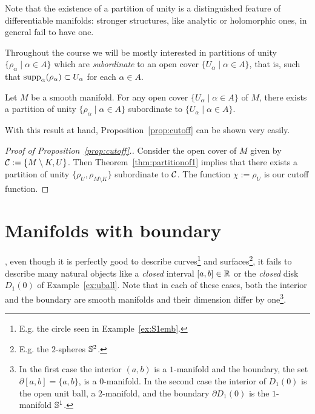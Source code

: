 \begin{remark}
	Note that the existence of a partition of unity is a distinguished feature of differentiable manifolds: stronger structures, like analytic or holomorphic ones, in general fail to have one.
\end{remark}

Throughout the course we will be mostly interested in partitions of unity $\{\rho_\alpha \mid \alpha\in A\}$ which are \emph{subordinate} to an open cover $\{U_\alpha\mid\alpha\in A\}$, that is, such that $\operatorname{supp}_\alpha(\rho_\alpha) \subset U_\alpha$ for each $\alpha\in A$.

\begin{theorem}\label{thm:partitionof1}
	Let $M$ be a smooth manifold. For any open cover $\{U_\alpha\mid\alpha\in A\}$ of $M$, there exists a partition of unity $\{\rho_\alpha \mid \alpha\in A\}$ subordinate to $\{U_\alpha\mid\alpha\in A\}$.
\end{theorem}

With this result at hand, Proposition~\ref{prop:cutoff} can be shown very easily.

\begin{proof}[Proof of Proposition~\ref{prop:cutoff}.]
	Consider the open cover of $M$ given by $\mathcal{C}:=\{M\setminus K, U\}$.
	Then Theorem~\ref{thm:partitionof1} implies that there exists a partition of unity $\{\rho_U, \rho_{M\setminus K}\}$ subordinate to $\mathcal{C}$. The function $\chi := \rho_U$ is our cutoff function.
\end{proof}

\section{Manifolds with boundary}\label{sec:mbnd}

, even though it is perfectly good to describe curves\footnote{E.g. the circle seen in Example~\ref{ex:S1emb}.} and surfaces\footnote{E.g. the $2$-spheres $\mathbb{S}^2$.}, it fails to describe many natural objects like a \emph{closed} interval $[a,b]\in\mathbb{R}$ or the \emph{closed} disk $D_1(0)$ of Example~\ref{ex:uball}.
Note that in each of these cases, both the interior and the boundary are smooth manifolds and their dimension differ by one\footnote{In the first case the interior $(a,b)$ is a $1$-manifold and the boundary, the set $\partial[a,b] = \{a,b\}$, is a $0$-manifold. In the second case the interior of $D_1(0)$ is the open unit ball, a $2$-manifold, and the boundary $\partial D_1(0)$ is the $1$-manifold $\mathbb{S}^1$.}.

